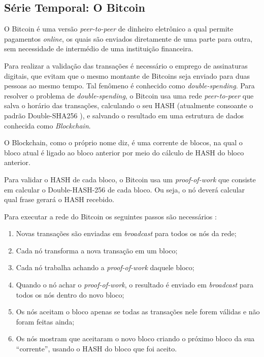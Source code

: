 \subsection{Série Temporal: O Bitcoin}
 
 O Bitcoin \cite{nakamoto2008bitcoin} é uma versão \emph{peer-to-peer} de dinheiro eletrônico a qual permite pagamentos \emph{online}, os quais são enviados diretamente de uma parte para outra, sem necessidade de intermédio de uma instituição financeira. 
 
 Para realizar a validação das transações é necessário o emprego de assinaturas digitais, que evitam que o mesmo montante de Bitcoins seja enviado para duas pessoas ao mesmo tempo. Tal fenômeno é conhecido como \textit{double-spending}. Para  resolver o problema de \textit{ double-spending}, o Bitcoin usa uma rede \emph{peer-to-peer} que salva o horário das transações, calculando o seu HASH (atualmente consoante o padrão Double-SHA256 \cite{okupski2014bitcoin, bitcoinwikihashcash}), e salvando o resultado em uma estrutura de dados conhecida como \textit{Blockchain}.
 
O Blockchain, como o próprio nome diz, é uma corrente de blocos, na qual o bloco atual é ligado ao bloco anterior por meio do cálculo de HASH do bloco anterior. 

Para validar o HASH de cada bloco, o Bitcoin usa um \textit{proof-of-work} que consiste em calcular o Double-HASH-256 de cada bloco. Ou seja, o nó deverá calcular qual frase gerará o HASH recebido.

Para executar a rede do Bitcoin os seguintes passos são necessários \cite{nakamoto2008bitcoin}:
\begin{enumerate}
\item Novas transações são enviadas em \textit{broadcast} para todos os nós da rede;
\item Cada nó transforma a nova transação em um bloco;
\item Cada nó trabalha achando a \textit{proof-of-work} daquele bloco;
\item Quando o nó achar o \textit{proof-of-work}, o resultado é enviado em \textit{broadcast} para todos os nós dentro do novo bloco;
\item Os nós aceitam o bloco apenas se todas as transações nele forem válidas e não foram feitas ainda;
\item Os nós mostram que aceitaram o novo bloco criando o próximo bloco da sua ``corrente'', usando o HASH do bloco que foi aceito.
\end{enumerate}

